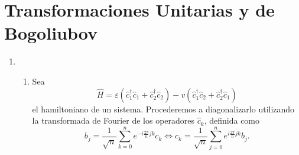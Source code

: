 \documentclass{scrartcl}
\newcommand{\inv}[1]{\frac{1}{#1}}
\renewcommand{\c}{\hat{c}}
\DeclareRobustCommand{\[}{\begin{equation}}
\DeclareRobustCommand{\]}{\end{equation}}
\begin{document}
\section{Transformaciones Unitarias y de Bogoliubov}
\begin{enumerate}
    
    \item \begin{enumerate}
        \item Sea
        \[ \hat H = \varepsilon (\c_1^\dagger \c_1 + \c_2^\dagger \c_2) - v (\c_1^\dagger \c_2 + \c_2^\dagger \c_1) \]
        el hamiltoniano de un sistema. Procederemos a diagonalizarlo utilizando la transformada de Fourier de los operadores $\c_k$, definida como
        \[ b_j = \inv{\sqrt{n}} \sum_{k = 0}^n e^{-i \frac{2\pi}{n} jk} c_k \iff c_k = \inv{\sqrt{n}} \sum_{j = 0}^n e^{i \frac{2\pi}{n} jk} b_j. \]
        

\end{enumerate}
\end{enumerate}
\end{document}
